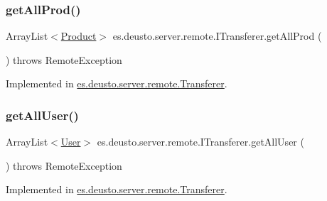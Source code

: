 \subsubsection{\texorpdfstring{get\+All\+Prod()}{getAllProd()}}
{\footnotesize\ttfamily Array\+List$<$\hyperlink{classes_1_1deusto_1_1server_1_1db_1_1data_1_1_product}{Product}$>$ es.\+deusto.\+server.\+remote.\+I\+Transferer.\+get\+All\+Prod (\begin{DoxyParamCaption}{ }\end{DoxyParamCaption}) throws Remote\+Exception}



Implemented in \hyperlink{classes_1_1deusto_1_1server_1_1remote_1_1_transferer_a29cbb75edeb4e0973780fd379ef2b3fb}{es.\+deusto.\+server.\+remote.\+Transferer}.

\mbox{\label{interfacees_1_1deusto_1_1server_1_1remote_1_1_i_transferer_aec6609427d773f075a78295a97888103}} 
\subsubsection{\texorpdfstring{get\+All\+User()}{getAllUser()}}
{\footnotesize\ttfamily Array\+List$<$\hyperlink{classes_1_1deusto_1_1server_1_1db_1_1data_1_1_user}{User}$>$ es.\+deusto.\+server.\+remote.\+I\+Transferer.\+get\+All\+User (\begin{DoxyParamCaption}{ }\end{DoxyParamCaption}) throws Remote\+Exception}



Implemented in \hyperlink{classes_1_1deusto_1_1server_1_1remote_1_1_transferer_a613c0c3af149140e58488ce9d0745593}{es.\+deusto.\+server.\+remote.\+Transferer}.

\mbox{\label{interfacees_1_1deusto_1_1server_1_1remote_1_1_i_transferer_ab767521556fc61bc5a39306080f00cae}} 
